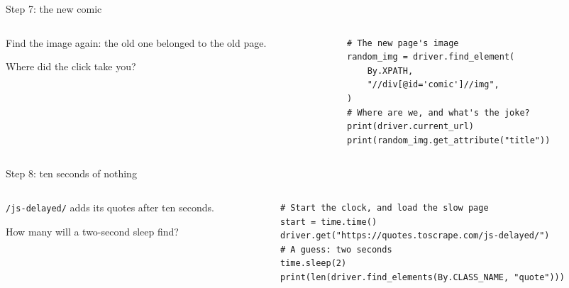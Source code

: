 \documentclass[9pt,aspectratio=169]{beamer}
\begin{document}
\begin{frame}[fragile]{Step 7: the new comic}
    \begin{columns}[T]
        \begin{column}{0.37\textwidth}
            Find the image again: the old one belonged to the old page.

            \medskip
            Where did the click take you?
        \end{column}
        \begin{column}{0.6\textwidth}
\begin{lstlisting}[style=lab]
# The new page's image
random_img = driver.find_element(
    By.XPATH,
    "//div[@id='comic']//img",
)
# Where are we, and what's the joke?
print(driver.current_url)
print(random_img.get_attribute("title"))
\end{lstlisting}
        \end{column}
    \end{columns}
\end{frame}

\begin{frame}[fragile]{Step 8: ten seconds of nothing}
    \begin{columns}[T]
        \begin{column}{0.37\textwidth}
            \texttt{/js-delayed/} adds its quotes after ten seconds.

            \medskip
            How many will a two-second sleep find?
        \end{column}
        \begin{column}{0.6\textwidth}
\begin{lstlisting}[style=lab]
# Start the clock, and load the slow page
start = time.time()
driver.get("https://quotes.toscrape.com/js-delayed/")
# A guess: two seconds
time.sleep(2)
print(len(driver.find_elements(By.CLASS_NAME, "quote")))
\end{lstlisting}
        \end{column}
    \end{columns}
\end{frame}
\end{document}
